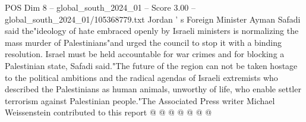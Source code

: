 \begin{textsample}{POS Dim 8 – global\_south\_2024\_01 – Score 3.00 – global\_south\_2024\_01/105368779.txt}
Jordan ' s Foreign Minister Ayman Safadi said the"ideology of hate embraced openly by Israeli ministers is normalizing the mass murder of Palestinians"and urged the council to stop it with a binding resolution.
Israel must be held accountable for war crimes and for blocking a Palestinian state, Safadi said."The future of the region can not be taken hostage to the political ambitions and the radical agendas of Israeli extremists who described the Palestinians as human animals, unworthy of life, who enable settler terrorism against Palestinian people."The Associated Press writer Michael Weissenstein contributed to this report @ @ @ @ @ @ @

\end{textsample}
